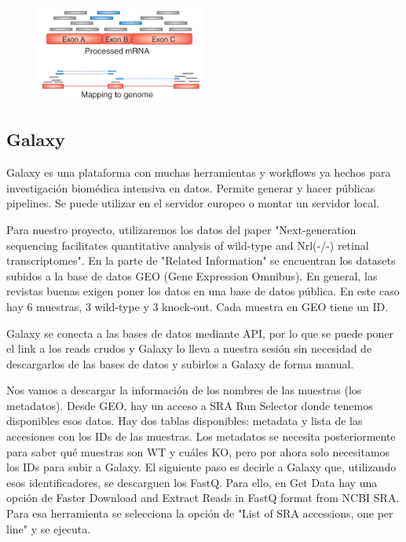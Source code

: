 \begin{figure}[h]
\centering
\includegraphics[width = 0.5\textwidth]{figs/Imagen1.png}
\end{figure}

\subsection{Galaxy}
Galaxy es una plataforma con muchas herramientas y workflows ya hechos para investigación biomédica intensiva en datos. Permite generar y hacer públicas pipelines. Se puede utilizar en el servidor europeo o montar un servidor local. 

Para nuestro proyecto, utilizaremos los datos del paper "Next-generation sequencing facilitates quantitative analysis of wild-type and Nrl(-/-) retinal transcriptomes". En la parte de "Related Information" se encuentran los datasets subidos a la base de datos GEO (Gene Expression Omnibus). En general, las revistas buenas exigen poner los datos en una base de datos pública. En este caso hay 6 muestras, 3 wild-type y 3 knock-out. Cada muestra en GEO tiene un ID. 

Galaxy se conecta a las bases de datos mediante API, por lo que se puede poner el link a los reads crudos y Galaxy lo lleva a nuestra sesión sin necesidad de descargarlos de las bases de datos y subirlos a Galaxy de forma manual. 

Nos vamos a descargar la información de los nombres de las muestras (los metadatos). Desde GEO, hay un acceso a SRA Run Selector donde tenemos disponibles esos datos. Hay dos tablas disponibles: metadata y lista de las accesiones con los IDs de las muestras. Los metadatos se necesita posteriormente para saber qué muestras son WT y cuáles KO, pero por ahora solo necesitamos los IDs para subir a Galaxy. El siguiente paso es decirle a Galaxy que, utilizando esos identificadores, se descarguen los FastQ. Para ello, en Get Data hay una opción de Faster Download and Extract Reads in FastQ format from NCBI SRA. Para esa herramienta se selecciona la opción de "List of SRA accessions, one per line" y se ejecuta.

